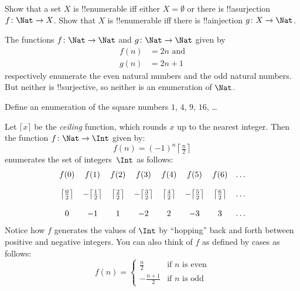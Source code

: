 \documentclass[../../../include/open-logic-section]{subfiles}
\begin{document}
\begin{prob}
  Show that a set $X$ is !!{enumerable} iff either $X = \emptyset$ or there is !!a{surjection} $f\colon \Nat \to X$. Show that $X$ is !!{enumerable} iff there is !!a{injection}
 $g\colon X \to \Nat$. 
\end{prob}

\begin{ex}
The functions $f\colon \Nat \to \Nat$ and $g \colon \Nat \to \Nat$ given by
\begin{align*}
f(n) & = 2n \text{ and}\\
g(n) & = 2n+1
\end{align*}
respectively enumerate the even natural numbers and the odd natural numbers. But neither is !!{surjective}, so neither is an enumeration of $\Nat$.
\end{ex}

\begin{prob}
Define an enumeration of the square numbers $1$, $4$, $9$, $16$, \dots
\end{prob}

\begin{ex}
	Let $\lceil x \rceil$ be the \emph{ceiling} function, which rounds
	$x$ up to the nearest integer. Then the function $f \colon \Nat \to \Int$ given by:
$$f(n) = (-1)^{n} \left\lceil\tfrac{n}{2}\right\rceil$$
enumerates the set of
integers~$\Int$ as follows:
\[
\begin{array}{c c c c c c c c}
f(0) & f(1) & f(2) & f(3) & f(4) & f(5) & f(6) & \dots \\ \\
\big\lceil \tfrac{0}{2} \big\rceil & -\big\lceil \tfrac{1}{2}\big\rceil &  \big\lceil \tfrac{2}{2} \big\rceil & -\big\lceil \tfrac{3}{2} \big\rceil & \big\lceil \tfrac{4}{2} \big\rceil  & -\big\lceil \tfrac{5}{2}\big\rceil & \big\lceil \tfrac{6}{2} \big\rceil & \dots \\ \\
0 & -1 & 1 & -2 & 2 & -3 & 3& \dots
\end{array}
\]
Notice how $f$ generates the values of $\Int$ by
``hopping'' back and forth between positive and negative integers. You can also think of $f$ as defined by cases as follows:
\[
f(n) = \begin{cases}
  \frac{n}{2} & \text{if $n$ is even}\\
  -\frac{n+1}{2} & \text{if $n$ is odd}
  \end{cases}
\]
\end{ex}
\end{document}
